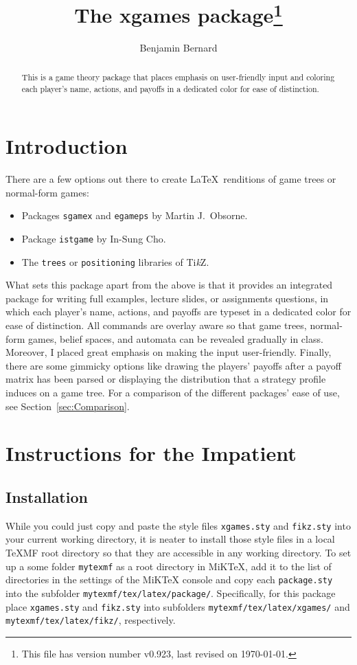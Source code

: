 \documentclass{article}
\title{\vspace{-7mm}The \textsf{xgames} package\footnote{This file has version number v0.923, last revised on \today.}}
\author{Benjamin Bernard}
\def\TikZ{Ti\emph{k}Z\xspace}
\begin{document}
\maketitle\vspace*{-5mm}

\begin{abstract}
This is a game theory package that places emphasis on user-friendly input and coloring each player's name, actions, and payoffs in a dedicated color for ease of distinction.
\end{abstract}

\section{Introduction}

There are a few options out there to create \LaTeX\ renditions of game trees or normal-form games:
\begin{itemize}
\item Packages \texttt{sgamex} and \texttt{egameps} by Martin J.~Obsorne.
\item Package \texttt{istgame} by In-Sung Cho. 
\item The \texttt{trees} or \texttt{positioning} libraries of \TikZ.
\end{itemize}
What sets this package apart from the above is that it provides an integrated package for writing full examples, lecture slides, or assignments questions, in which each player's name, actions, and payoffs are typeset in a dedicated color for ease of distinction. All commands are overlay aware so that game trees, normal-form games, belief spaces, and automata can be revealed gradually in class. Moreover, I placed great emphasis on making the input user-friendly. Finally, there are some gimmicky options like drawing the players' payoffs after a payoff matrix has been parsed or displaying the distribution that a strategy profile induces on a game tree. 
%
For a comparison of the different packages' ease of use, see Section~\ref{sec:Comparison}.

\section{Instructions for the Impatient}

\subsection{Installation}

While you could just copy and paste the style files \texttt{xgames.sty} and \texttt{fikz.sty} into your current working directory, it is neater to install those style files in a local TeXMF root directory so that they are accessible in any working directory. To set up a some folder \texttt{mytexmf} as a root directory in MiKTeX, add it to the list of directories in the settings of the MiKTeX console and copy each \texttt{package.sty} into the subfolder \texttt{mytexmf/tex/latex/package/}. Specifically, for this package place \texttt{xgames.sty} and \texttt{fikz.sty} into subfolders \texttt{mytexmf/tex/latex/xgames/} and \texttt{mytexmf/tex/latex/fikz/}, respectively. 
\end{document}
